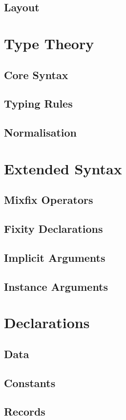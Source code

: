\documentclass{article}
\begin{document}
\subsection{Layout}
\label{sec:layout}
\section{Type Theory}
\subsection{Core Syntax}
\subsection{Typing Rules}
\subsection{Normalisation}
\section{Extended Syntax}
\subsection{Mixfix Operators}
\subsection{Fixity Declarations}
\subsection{Implicit Arguments}
\subsection{Instance Arguments}
\section{Declarations}
\subsection{Data}
\subsection{Constants}
\subsection{Records}
\end{document}
